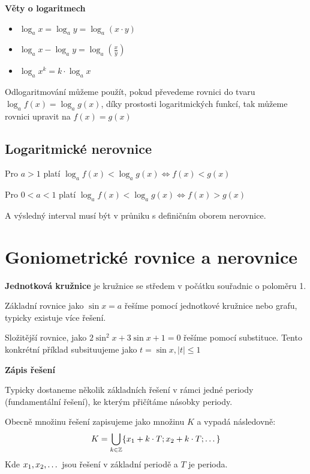 \documentclass[12pt]{article}
\begin{document}
\textbf{Věty o logaritmech}
\begin{itemize} [itemsep = 2pt]
    \item $\log_a x = \log_a y = \log_a(x\cdot y)$
    \item $\log_a x - \log_a y = \log_a(\frac{x}{y})$
    \item $\log_a x^k = k \cdot \log_a x$
\end{itemize}

Odlogaritmování můžeme použít, pokud převedeme rovnici do tvaru $\log_a f(x) = \log_a g(x)$, díky prostosti logaritmických funkcí, tak můžeme rovnici upravit na $f(x) = g(x)$

\subsection*{Logaritmické nerovnice}
Pro $a>1$ platí $\log_a f(x) < \log_a g(x) \Leftrightarrow f(x) < g(x)$

Pro $0<a<1$ platí $\log_a f(x) < \log_a g(x) \Leftrightarrow f(x) > g(x)$

A výsledný interval musí být v průniku s definičním oborem nerovnice.

\section*{Goniometrické rovnice a nerovnice}
\textbf{Jednotková kružnice} je kružnice se středem v počátku souřadnic o poloměru 1.

Základní rovnice jako $\sin x = a$ řešíme pomocí jednotkové kružnice nebo grafu, typicky existuje více řešení.

Složitější rovnice, jako $2\sin^2 x + 3\sin x + 1 = 0$ řešíme pomocí substituce. Tento konkrétní příklad subsituujeme jako $t = \sin x, |t|\leq 1$

\textbf{Zápis řešení}

Typicky dostaneme několik základních řešení v rámci jedné periody (fundamentální řešení), ke kterým přičítáme násobky periody.

Obecně množinu řešení zapisujeme jako množinu $K$ a vypadá následovně:
\[K = \underset{k\in\mathbb{Z}}{\bigcup}\{x_1 + k\cdot T; x_2 + k\cdot T; \text{\dots}\}\]
Kde $x_1, x_2, \text{\dots}$ jsou řešení v základní periodě a $T$ je perioda.
\end{document}
